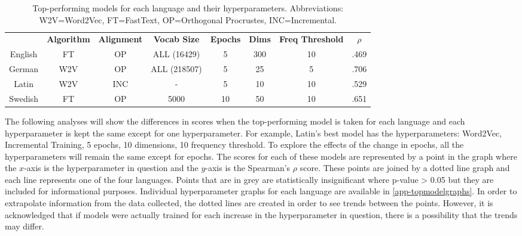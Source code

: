 \begin{table}[h]
\centering
\begin{tabular}{cccccccc} 
\toprule
\textbf{ } & \textbf{ Algorithm } & \textbf{ Alignment } & \textbf{ Vocab Size } & \textbf{ Epochs } & \textbf{ Dims } & \textbf{ Freq Threshold } & \textbf{ $\rho$ }  \\
English    & FT              & OP               & ALL (16429)      & 5                 & 300             & 10               & .469            \\
German     & W2V             & OP               & ALL (218507)     & 5                 & 25              & 5                & .706            \\
Latin      & W2V             & INC              & -                & 5                 & 10              & 10               & .529            \\
Swedish    & FT              & OP               & 5000             & 10                & 50              & 10               & .651            \\
\bottomrule
\end{tabular}
\caption{Top-performing models for each language and their hyperparameters. Abbreviations: W2V=Word2Vec, FT=FastText, OP=Orthogonal Procrustes, INC=Incremental.}
\label{tab:top-models}
\end{table}

The following analyses will show the differences in scores when the top-performing model is taken for each language and each hyperparameter is kept the same except for one hyperparameter. For example, Latin’s best model has the hyperparameters: Word2Vec, Incremental Training, 5 epochs, 10 dimensions, 10 frequency threshold. To explore the effects of the change in epochs, all the hyperparameters will remain the same except for epochs. The scores for each of these models are represented by a point in the graph where the $x$-axis is the hyperparameter in question and the $y$-axis is the Spearman's $\rho$ score. These points are joined by a dotted line graph and each line represents one of the four languages. Points that are in grey are statistically insignificant where p-value > 0.05 but they are included for informational purposes. Individual hyperparameter graphs for each language are available in \autoref{app-topmodelgraphs}. In order to extrapolate information from the data collected, the dotted lines are created in order to see trends between the points. However, it is acknowledged that if models were actually trained for each increase in the hyperparameter in question, there is a possibility that the trends may differ. 


